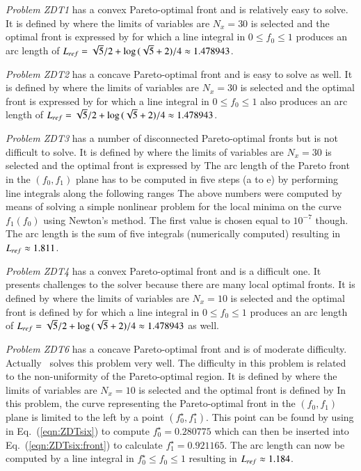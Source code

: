 \documentclass[final,5p,times,twocolumn]{elsarticle}
\newcommand{\eqname}  {Eq.}
\begin{document}
\emph{Problem ZDT1} has a convex Pareto-optimal front and is relatively easy to solve. It is defined
by
\ZDTone
where the limits of variables are
\ZDToneX
$N_x=30$ is selected and the optimal front is expressed by
\ZDToneFront
for which a line integral in ${0 \leq f_0 \leq 1}$ produces an arc length of ${L_{ref} = \sqrt{5}/2 + \log{(\sqrt{5}+2)}/4 \approx 1.478943}$.


\emph{Problem ZDT2} has a concave Pareto-optimal front and is easy to solve as well. It is defined
by
\ZDTtwo
where the limits of variables are
\ZDTtwoX
$N_x=30$ is selected and the optimal front is expressed by
\ZDTtwoFront
for which a line integral in ${0 \leq f_0 \leq 1}$ also produces an arc length of ${L_{ref} = \sqrt{5}/2 + \log{(\sqrt{5}+2)}/4 \approx 1.478943}$.


\emph{Problem ZDT3} has a number of disconnected Pareto-optimal fronts but is not difficult to
solve. It is defined by
\ZDTthree
where the limits of variables are
\ZDTthreeX
$N_x=30$ is selected and the optimal front is expressed by
\ZDTthreeFront
The arc length of the Pareto front in the $(f_0,f_1)$ plane has to be computed in five steps (a to
e) by performing line integrals along the following ranges
\ZDTthreeFrontRanges
The above numbers were computed by means of solving a simple nonlinear problem for the local minima
on the curve $f_1(f_0)$ using Newton's method. The first value is chosen equal to
$10^{-7}$ though. The arc length is the sum of five integrals (numerically computed) resulting in
$L_{ref} \approx 1.811$.


\emph{Problem ZDT4} has a convex Pareto-optimal front and is a difficult one. It presents
challenges to the solver because there are many local optimal fronts. It is defined by
\ZDTfour
where the limits of variables are
\ZDTfourX
$N_x=10$ is selected and the optimal front is defined by
\ZDTfourFront
for which a line integral in ${0 \leq f_0 \leq 1}$ produces an arc length of ${L_{ref} = \sqrt{5}/2 + \log{(\sqrt{5}+2)}/4 \approx 1.478943}$
as well.


\emph{Problem ZDT6} has a concave Pareto-optimal front and is of moderate difficulty. Actually
\goga~solves this problem very well. The difficulty in this problem is related to the non-uniformity
of the Pareto-optimal region. It is defined by
\ZDTsix
where the limits of variables are
\ZDTsixX
$N_x=10$ is selected and the optimal front is defined by
\ZDTsixFront
In this problem, the curve representing the Pareto-optimal front in the $(f_0,f_1)$ plane is limited
to the left by a point $(f_0^{\star},f_1^{\star})$. This point can be found by using
\ZDTsixXstar
in \eqname~(\ref{eqn:ZDTsix}) to compute $f_0^{\star}=0.280775$ which can then be inserted into
\eqname~(\ref{eqn:ZDTsix:front}) to calculate $f_1^{\star}=0.921165$. The arc length can now be
computed by a line integral in $f_0^{\star} \leq f_0 \leq 1$ resulting in $L_{ref} \approx 1.184$.
\end{document}
